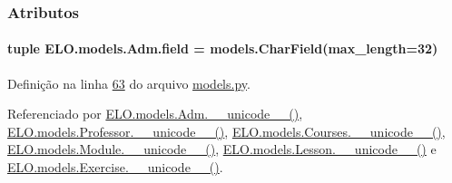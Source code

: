 

\subsubsection{Atributos}
\hypertarget{classELO_1_1models_1_1Adm_ae1af4ca22491b1cfe9cb0a7acefaa71e}{
\paragraph[{field}]{\setlength{\rightskip}{0pt plus 5cm}tuple E\-L\-O.\-models.\-Adm.\-field = models.\-Char\-Field(max\-\_\-length=32)\hspace{0.3cm}{\ttfamily [static]}}}\label{classELO_1_1models_1_1Adm_ae1af4ca22491b1cfe9cb0a7acefaa71e}


Definição na linha \hyperlink{ELO_2models_8py_source_l00063}{63} do arquivo \hyperlink{ELO_2models_8py_source}{models.\-py}.



Referenciado por \hyperlink{classELO_1_1models_1_1Adm_a3541c3ae12b8d2da3f44ac6be00a23e6}{E\-L\-O.\-models.\-Adm.\-\_\-\-\_\-unicode\-\_\-\-\_\-()}, \hyperlink{classELO_1_1models_1_1Professor_aefc9d63d429e19ec3487a7879879f29d}{E\-L\-O.\-models.\-Professor.\-\_\-\-\_\-unicode\-\_\-\-\_\-()}, \hyperlink{classELO_1_1models_1_1Courses_a8926a37152be8d4fc3e0ba6af200f871}{E\-L\-O.\-models.\-Courses.\-\_\-\-\_\-unicode\-\_\-\-\_\-()}, \hyperlink{classELO_1_1models_1_1Module_a1b54aa7a5e8dac090dea0926eca5550d}{E\-L\-O.\-models.\-Module.\-\_\-\-\_\-unicode\-\_\-\-\_\-()}, \hyperlink{classELO_1_1models_1_1Lesson_a3d9f0295dbe1ed5c74668d6c0876f97c}{E\-L\-O.\-models.\-Lesson.\-\_\-\-\_\-unicode\-\_\-\-\_\-()} e \hyperlink{classELO_1_1models_1_1Exercise_af3e991e5610cec815a2c3260ec6aae0b}{E\-L\-O.\-models.\-Exercise.\-\_\-\-\_\-unicode\-\_\-\-\_\-()}.

